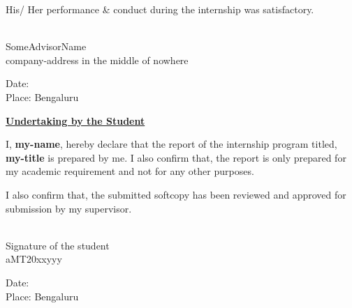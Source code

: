 \documentclass[english,a4paper,11pt]{report}
\newcommand{\reporttitle}{my-title}
\newcommand{\studentname}{my-name}
\newcommand{\rollnumber}{aMT20xxyyy}
\newcommand{\advisorname}{SomeAdvisorName}
\newcommand{\companyaddress}{company-address in the middle of nowhere}
\begin{document}
	\noindent His/ Her performance \& conduct during the internship was satisfactory.
	
	\vspace*{6cm}
	\begin{flushright}
		\makebox[2.5in]{\hrulefill}\\
		\advisorname\\
		\companyaddress\\
	\end{flushright}
	
	\vspace*{3cm}
	\noindent Date: \\
	\noindent Place: Bengaluru \\
	\clearpage
	
	\newpage
	
	\thispagestyle{empty}
	\begin{center}
		\Large
		\underline{\textbf{Undertaking by the Student}}
		\vspace{1cm}
	\end{center}
	
	\large
	\noindent I, \textbf{\studentname}, hereby declare that the report of the internship program titled,	\textbf{\reporttitle} is prepared by me. I also confirm that, the report is only prepared for my academic requirement and not for any other purposes.
	
	\vspace*{0.5cm}
	\noindent I also confirm that, the submitted softcopy has been reviewed and approved for submission by my supervisor.
	
	\vspace*{2cm}
	\begin{flushright}
		\makebox[2.5in]{\hrulefill}\\
		Signature of the student\\
		\rollnumber
	\end{flushright}
	
	\vspace*{2cm}
	\noindent Date: \\
	\noindent Place: Bengaluru \\
	
	\afterpage{\null\newpage}
	
	\newpage
	\setcounter{page}{4}
	\thispagestyle{plain}
	
\end{document}
